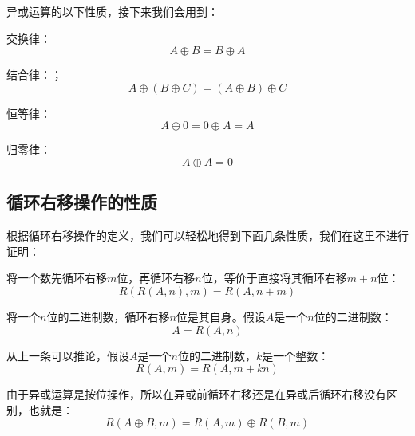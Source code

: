 \documentclass[12pt,AutoFakeSlant,AutoFakeBold]{article}
\newcommand{\nor}{\oplus}
\begin{document}
异或运算的以下性质，接下来我们会用到：

\begin{itemize*}
    \item 交换律：
    \begin{equation}
        A\nor B=B\nor A
    \end{equation}
    \item 结合律：；
    \begin{equation}
        A\nor (B \nor C) = (A\nor B) \nor C
    \end{equation}
    \item 恒等律：
    \begin{equation}
        A\nor 0=0\nor A=A
    \end{equation}
    \item 归零律：
    \begin{equation}
        A\nor A=0
    \end{equation}
\end{itemize*}

\subsection{循环右移操作的性质}

根据循环右移操作的定义，我们可以轻松地得到下面几条性质，我们在这里不进行证明：

\begin{itemize*}
    \item 将一个数先循环右移$m$位，再循环右移$n$位，等价于直接将其循环右移$m+n$位：
    \begin{equation}
        R(R(A,n),m) = R(A,n+m)
    \end{equation}
    \item 将一个$n$位的二进制数，循环右移$n$位是其自身。假设$A$是一个$n$位的二进制数：
    \begin{equation}
        A = R(A,n)
    \end{equation}
    \item 从上一条可以推论，假设$A$是一个$n$位的二进制数，$k$是一个整数：
    \begin{equation}
        R(A,m)=R(A,m+kn)
    \end{equation}
    \item 由于异或运算是按位操作，所以在异或前循环右移还是在异或后循环右移没有区别，也就是：
    \begin{equation}
        R(A\nor B,m) = R(A,m)\nor R(B,m)
    \end{equation}
\end{itemize*}
\end{document}
